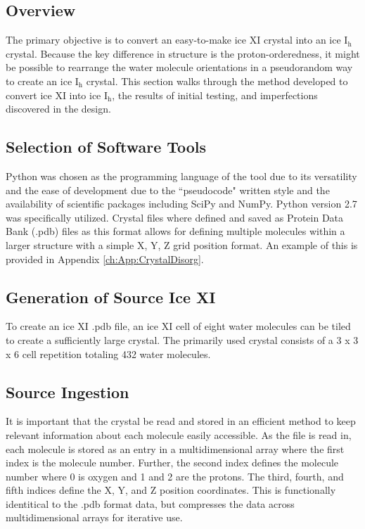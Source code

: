 \subsection{Overview}

The primary objective is to convert an easy-to-make ice XI crystal into an ice I$_{\mathrm{h}}$ crystal.
Because the key difference in structure is the proton-orderedness, it might be possible to rearrange the water molecule orientations in a pseudorandom way to create an ice I$_{\mathrm{h}}$ crystal.
This section walks through the method developed to convert ice XI into ice I$_{\mathrm{h}}$, the results of initial testing, and imperfections discovered in the design.

\subsection{Selection of Software Tools}

Python was chosen as the programming language of the tool due to its versatility and the ease of development due to the ``pseudocode" written style and the availability of scientific packages including SciPy and NumPy. 
Python version 2.7 was specifically utilized.
Crystal files where defined and saved as Protein Data Bank (.pdb) files as this format allows for defining multiple molecules within a larger structure with a simple X, Y, Z grid position format. 
An example of this is provided in Appendix \ref{ch:App:CrystalDisorg}.

\subsection{Generation of Source Ice XI}

To create an ice XI .pdb file, an ice XI cell of eight water molecules can be tiled to create a sufficiently large crystal.
The primarily used crystal consists of a 3 x 3 x 6 cell repetition totaling 432 water molecules.

\subsection{Source Ingestion}

It is important that the crystal be read and stored in an efficient method to keep relevant information about each molecule easily accessible. 
As the file is read in, each molecule is stored as an entry in a multidimensional array where the first index is the molecule number. 
Further, the second index defines the molecule number where 0 is oxygen and 1 and 2 are the protons. 
The third, fourth, and fifth indices define the X, Y, and Z position coordinates. 
This is functionally identitical to the .pdb format data, but compresses the data across multidimensional arrays for iterative use.

